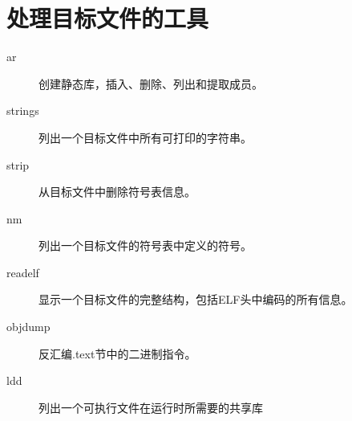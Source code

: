 
\section{处理目标文件的工具}
{
    \begin{description}
        \item[ar] 创建静态库，插入、删除、列出和提取成员。
        \item[strings] 列出一个目标文件中所有可打印的字符串。
        \item[strip] 从目标文件中删除符号表信息。
        \item[nm] 列出一个目标文件的符号表中定义的符号。
        \item[readelf] 显示一个目标文件的完整结构，包括ELF头中编码的所有信息。
        \item[objdump] 反汇编.text节中的二进制指令。
        \item[ldd] 列出一个可执行文件在运行时所需要的共享库
    \end{description}
}
